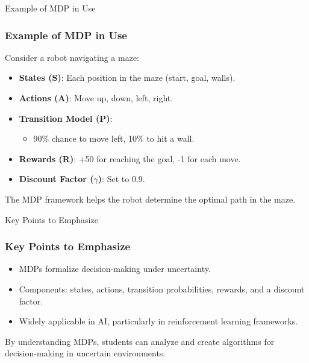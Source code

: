 \documentclass[aspectratio=169]{beamer}
\begin{document}
\begin{frame}[fragile]{Example of MDP in Use}
    \frametitle{Example of MDP in Use}
    Consider a robot navigating a maze:
    \begin{itemize}
        \item \textbf{States (S)}: Each position in the maze (start, goal, walls).
        \item \textbf{Actions (A)}: Move up, down, left, right.
        \item \textbf{Transition Model (P)}:
            \begin{itemize}
                \item 90\% chance to move left, 10\% to hit a wall.
            \end{itemize}
        \item \textbf{Rewards (R)}: +50 for reaching the goal, -1 for each move.
        \item \textbf{Discount Factor ($\gamma$)}: Set to 0.9.
    \end{itemize}
    The MDP framework helps the robot determine the optimal path in the maze.
\end{frame}

\begin{frame}[fragile]{Key Points to Emphasize}
    \frametitle{Key Points to Emphasize}
    \begin{itemize}
        \item MDPs formalize decision-making under uncertainty.
        \item Components: states, actions, transition probabilities, rewards, and a discount factor.
        \item Widely applicable in AI, particularly in reinforcement learning frameworks.
    \end{itemize}
    By understanding MDPs, students can analyze and create algorithms for decision-making in uncertain environments.
\end{frame}
\end{document}
